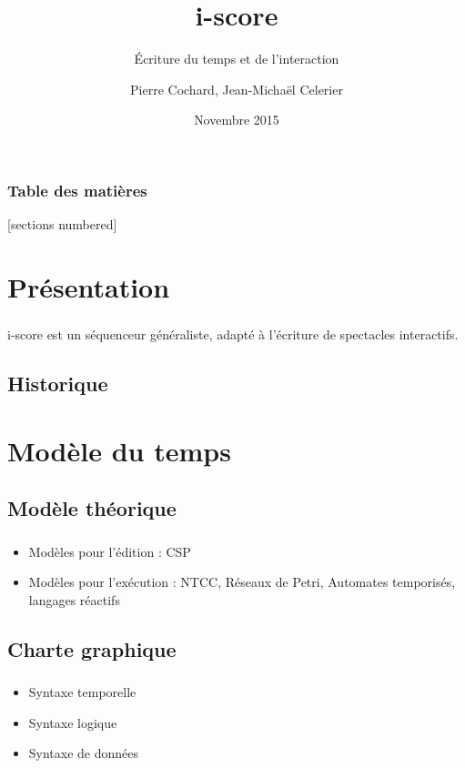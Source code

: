\documentclass[french,12pt,t]{beamer}
\title{i-score}
\subtitle{Écriture du temps et de l'interaction}
\date{Novembre 2015}
\author{Pierre Cochard, Jean-Michaël Celerier}
\institute{LaBRI, SCRIME, Blue Yeti}
\makeatletter
\newcommand*{\currentname}{\@currentlabelname}
\makeatother
\begin{document}
    
    \maketitle

\begin{frame}
    \frametitle{Table des matières}
    [sections numbered]
    \tableofcontents[hideallsubsections]
\end{frame}

\section{Présentation}
\begin{frame}
    \frametitle{\currentname}
    i-score est un séquenceur généraliste, adapté à l'écriture de spectacles interactifs.
    
    
\end{frame}

\subsection{Historique}
\begin{frame}
    \frametitle{\currentname}
\end{frame}


\section{Modèle du temps}
\subsection{Modèle théorique}
\begin{frame}
    \frametitle{\currentname}
    \begin{itemize}
        \item Modèles pour l'édition :
        CSP
        
        \item Modèles pour l'exécution :
        NTCC, Réseaux de Petri, Automates temporisés, langages réactifs
    \end{itemize}
\end{frame}

\subsection{Charte  graphique}
\begin{frame}
    \frametitle{\currentname}
    \begin{itemize}
        \item Syntaxe temporelle
        
        \item Syntaxe logique
        
        \item Syntaxe de données
    \end{itemize}
\end{frame}
\end{document}
